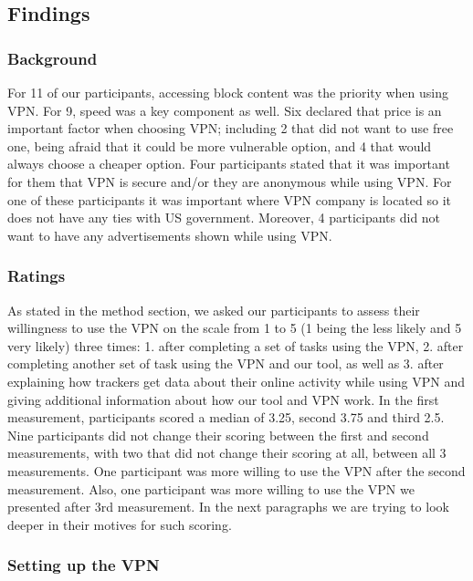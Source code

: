 \subsection{Findings}

\subsubsection{Background}

For 11 of our participants, accessing block content was the priority when using VPN. For 9, speed was a key component as well. Six declared that price is an important factor when choosing VPN; including 2 that did not want to use free one, being afraid that it could be more vulnerable option, and 4 that would always choose a cheaper option. Four participants stated that it was important for them that VPN is secure and/or they are anonymous while using VPN. For one of these participants it was important where VPN company is located so it does not have any ties with US government. 
Moreover, 4 participants did not want to have any advertisements shown while using VPN. 

\subsubsection{Ratings}

As stated in the method section, we asked our participants to assess their willingness to use the VPN on the scale from 1 to 5 (1 being the less likely and 5 very likely) three times: 
1.	after completing a set of tasks using the VPN, 
2.	after completing another set of task using the VPN and our tool, as well as 
3.	after explaining how trackers get data about their online activity while using VPN and giving additional information about  how our tool and VPN work.
In the first measurement, participants scored a median of 3.25, second 3.75 and third 2.5. Nine participants did not change their scoring between the first and second measurements, with two that did not change their scoring at all, between all 3 measurements. One participant was more willing to use the VPN after the second measurement. Also, one participant was more willing to use the VPN we presented after 3rd measurement.
In the next paragraphs we are trying to look deeper in their motives for such scoring.  
    


\subsubsection{Setting up the VPN}

